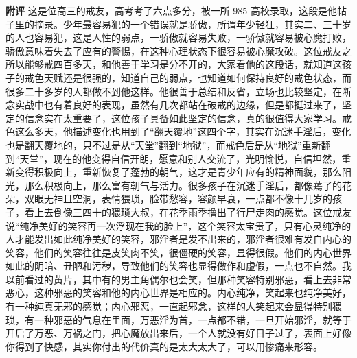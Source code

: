 \begin{case}
    \textbf{附评} 这是位高三的戒友，高考考了六点多分，被一所 985 高校录取，这段是他帖子里的摘录。少年最容易犯的一个错误就是骄傲，所谓年少轻狂，其实二、三十岁的人也容易犯，这是人性的弱点，一骄傲就容易失败，一骄傲就容易被心魔打败，骄傲意味着失去了应有的警惕，在这种心理状态下很容易被心魔攻破。这位戒友之所以能够戒四百多天，和他善于学习是分不开的，大家看他的这段话，就知道这孩子的戒色天赋还是很强的，知道自己的弱点，也知道如何保持良好的戒色状态，而很多二十多岁的人都做不到他这样。他很善于总结和反省，立场也比较坚定，在断念实战中也有着良好的表现，虽然有几次都站在破戒的边缘，但是都挺过来了，坚定的信念实在太重要了，这位孩子具备如此坚定的信念，真的很值得大家学习。戒色这么多天，他描述变化也用到了“翻天覆地”这四个字，其实在沉迷手淫后，变化也是翻天覆地的，只不过是从“天堂”翻到“地狱”，而戒色后是从“地狱”重新翻到“天堂”，现在的他变得自信开朗，愿意和别人交流了，光明愉悦，自信坦然，重新变得积极向上，重新恢复了蓬勃的朝气，这才是青少年应有的精神面貌，那么阳光，那么积极向上，那么富有朝气与活力。很多孩子在沉迷手淫后，都像蔫了的花朵，双眼无神且空洞，表情猥琐，脸带愁容，容颜早衰，一点都不像十几岁的孩子，看上去倒像三四十的猥琐大叔，在花季雨季撸出了行尸走肉的感觉。这位戒友说“纯净美好的笑容再一次浮现在我的脸上”，这个笑容太宝贵了，只有心灵纯净的人才能发出如此纯净美好的笑容，邪淫者是发不出来的，邪淫者很难有发自内心的笑容，他们的笑容往往是皮笑肉不笑，很僵硬的笑容，显得很假。他们的内心世界如此的阴暗、丑陋和污秽，导致他们的笑容也显得做作和虚假，一点也不自然。我以前看过的黄片，其中有的男主角偶尔也会笑，但那种笑容特别邪恶，看上去非常恶心，这种邪恶的笑容和他的内心世界是相应的。内心纯净，笑起来也纯净美好，有一种纯真无邪的感觉；内心邪恶，一直起邪念，这样的人笑起来会显得特别猥琐，有一种邪恶的气息在里面，万恶淫为首，一点都不错，一旦开始邪淫，就等于开启了万恶、万祸之门，把心魔放出来后，一个人就没有好日子过了，表面上好像你得到了快感，其实你付出的代价真的是太大太大了，可以用惨痛来形容。


\end{case}
